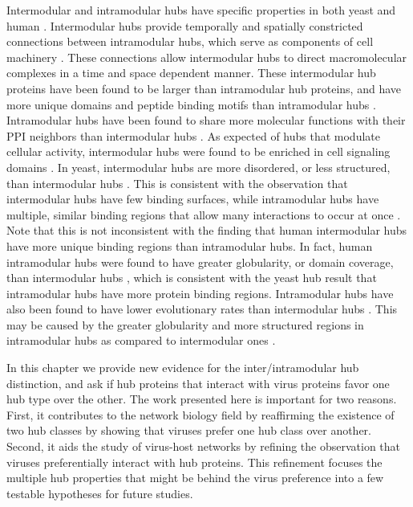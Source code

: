 Intermodular and intramodular hubs have specific properties in both
yeast and human \cite{taylor09,fraser05}. Intermodular hubs provide
temporally and spatially constricted connections between intramodular
hubs, which serve as components of cell machinery \cite{fraser05}.
These connections allow intermodular hubs to direct macromolecular
complexes in a time and space dependent manner. These intermodular hub
proteins have been found to be larger than intramodular hub proteins,
and have more unique domains and peptide binding motifs than
intramodular hubs \cite{taylor09}. Intramodular hubs have been found
to share more molecular functions with their PPI neighbors than
intermodular hubs \cite{taylor09}. As expected of hubs that modulate
cellular activity, intermodular hubs were found to be enriched in cell
signaling domains \cite{taylor09}. In yeast, intermodular hubs are
more disordered, or less structured, than intermodular hubs
\cite{ekman2006properties,singh2007role}. This is consistent with the
observation that intermodular hubs have few binding surfaces, while
intramodular hubs have multiple, similar binding regions that allow
many interactions to occur at once \cite{kim2008role}. Note that this
is not inconsistent with the finding that human intermodular hubs have
more unique binding regions than intramodular hubs. In fact, human
intramodular hubs were found to have greater globularity, or domain
coverage, than intermodular hubs \cite{taylor09}, which is consistent
with the yeast hub result that intramodular hubs have more protein
binding regions. Intramodular hubs have also been found to have lower
evolutionary rates than intermodular hubs
\cite{fraser2005modularity}. This may be caused by the greater
globularity and more structured regions in intramodular hubs as
compared to intermodular ones \cite{kahali2009exploring}.

In this chapter we provide new evidence for the inter/intramodular hub
distinction, and ask if hub proteins that interact with virus proteins
favor one hub type over the other. The work presented here is
important for two reasons. First, it contributes to the network
biology field by reaffirming the existence of two hub classes by
showing that viruses prefer one hub class over another. Second, it
aids the study of virus-host networks by refining the observation that
viruses preferentially interact with hub proteins. This refinement
focuses the multiple hub properties that might be behind the virus
preference into a few testable hypotheses for future studies.

